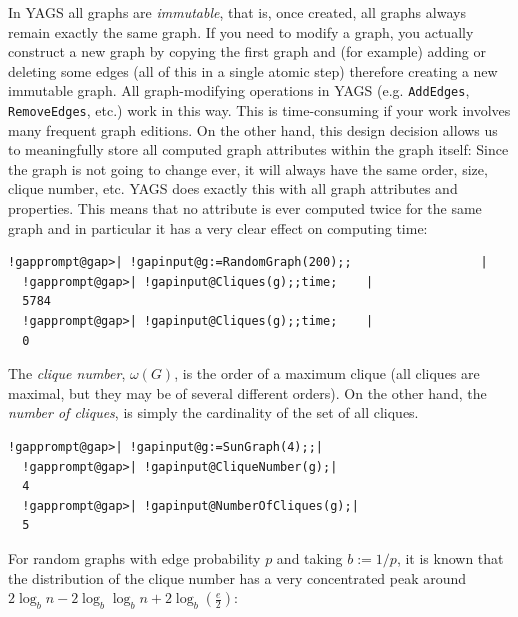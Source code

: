 \documentclass[a4paper,11pt]{report}
\begin{document}
{{ In \textsf{YAGS} all graphs are \emph{immutable}, that is, once created, all graphs always remain exactly the same graph. If
you need to modify a graph, you actually construct a new graph by copying the
first graph and (for example) adding or deleting some edges (all of this in a
single atomic step) therefore creating a new immutable graph. All
graph-modifying operations in \textsf{YAGS} (e.g. \texttt{AddEdges}, \texttt{RemoveEdges}, etc.) work in this way. This is time-consuming if your work involves many
frequent graph editions. On the other hand, this design decision allows us to
meaningfully store all computed graph attributes within the graph itself:
Since the graph is not going to change ever, it will always have the same
order, size, clique number, etc. \textsf{YAGS} does exactly this with all graph attributes and properties. This means that no
attribute is ever computed twice for the same graph and in particular it has a
very clear effect on computing time: 
\begin{Verbatim}[commandchars=!@|,fontsize=\small,frame=single,label=Example]
  !gapprompt@gap>| !gapinput@g:=RandomGraph(200);;                  |
  !gapprompt@gap>| !gapinput@Cliques(g);;time;    |
  5784
  !gapprompt@gap>| !gapinput@Cliques(g);;time;    |
  0
\end{Verbatim}
 

The \emph{clique number}, $\omega(G)$, is the order of a maximum clique (all cliques are maximal, but they may be
of several different orders). On the other hand, the \emph{number of cliques}, is simply the cardinality of the set of all cliques. 

 
\begin{Verbatim}[commandchars=!@|,fontsize=\small,frame=single,label=Example]
  !gapprompt@gap>| !gapinput@g:=SunGraph(4);;|
  !gapprompt@gap>| !gapinput@CliqueNumber(g);|
  4
  !gapprompt@gap>| !gapinput@NumberOfCliques(g);|
  5
\end{Verbatim}
 

For random graphs with edge probability $p$ and taking $b:=1/p$, it is known \cite{Bol01} that the distribution of the clique number has a very concentrated peak around $2\log_{b}n-2\log_{b}\log_{b}n +2\log_{b}(\frac{e}{2})$: 

}}
\end{document}
